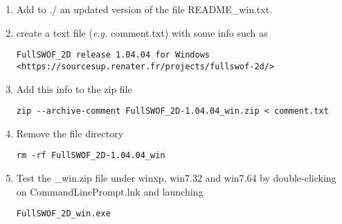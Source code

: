 \documentclass[a4paper, 11pt]{article}
\begin{document}
\begin{enumerate}
\begin{itemize}
	\end{itemize}
\item Add to ./ an updated version of the file README\_win.txt.
\item create a text file (\emph{e.g.} comment.txt) with some info such as
\begin{verbatim}
FullSWOF_2D release 1.04.04 for Windows
<https://sourcesup.renater.fr/projects/fullswof-2d/>
\end{verbatim}
\item Add this info to the zip file
\begin{verbatim}
zip --archive-comment FullSWOF_2D-1.04.04_win.zip < comment.txt
\end{verbatim}
\item Remove the file directory
\begin{verbatim}
rm -rf FullSWOF_2D-1.04.04_win
\end{verbatim}

\item Test the \_win.zip file under winxp, win7.32 and win7.64 by
double-clicking on CommandLinePrompt.lnk and launching
\begin{verbatim}
FullSWOF_2D_win.exe
\end{verbatim}
\end{enumerate}
\end{document}
